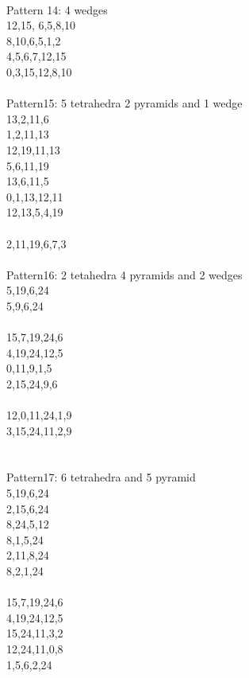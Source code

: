 \documentclass[twocolumn]{article}
\begin{document}
 \\
\tiny Pattern 14: 4 wedges \\
\tiny 12,15, 6,5,8,10 \\
\tiny 8,10,6,5,1,2 \\
\tiny 4,5,6,7,12,15 \\
\tiny 0,3,15,12,8,10 \\

 \\
\tiny Pattern15: 5 tetrahedra 2 pyramids and 1 wedge \\
\tiny 13,2,11,6 \\
\tiny 1,2,11,13 \\
\tiny 12,19,11,13 \\
\tiny 5,6,11,19 \\
\tiny 13,6,11,5
\tiny   \\
\tiny 0,1,13,12,11 \\
\tiny 12,13,5,4,19 \\
\tiny   \\
\tiny 2,11,19,6,7,3 \\
%
%
 \\
\tiny Pattern16: 2 tetahedra 4 pyramids and 2 wedges \\
\tiny  5,19,6,24\\
\tiny  5,9,6,24\\
\tiny  \\
\tiny  15,7,19,24,6 \\
\tiny  4,19,24,12,5 \\
\tiny  0,11,9,1,5 \\
\tiny  2,15,24,9,6 \\
\tiny  \\
\tiny  12,0,11,24,1,9\\
\tiny  3,15,24,11,2,9\\
\tiny  \\

 \\
\tiny  Pattern17: 6 tetrahedra and 5 pyramid\\
\tiny  5,19,6,24 \\
\tiny  2,15,6,24 \\
\tiny  8,24,5,12 \\
\tiny  8,1,5,24 \\
\tiny  2,11,8,24\\
\tiny  8,2,1,24\\
\tiny  \\
\tiny  15,7,19,24,6\\
\tiny  4,19,24,12,5\\
\tiny  15,24,11,3,2 \\
\tiny  12,24,11,0,8 \\
\tiny  1,5,6,2,24 \\
\tiny  \\
\end{document}
